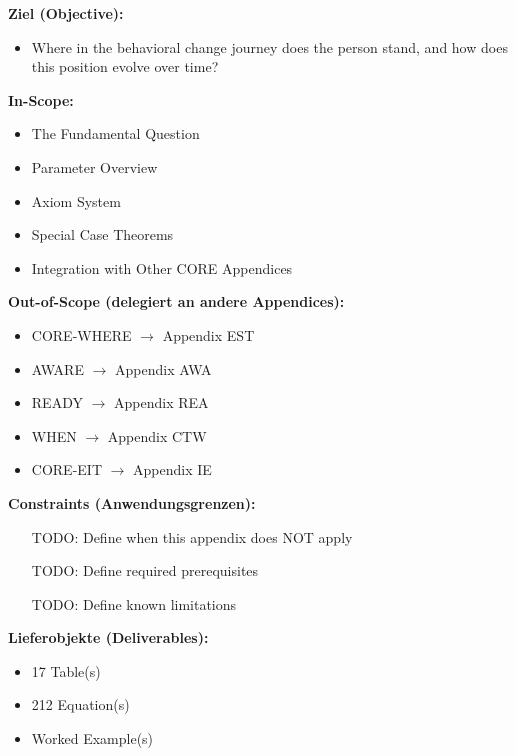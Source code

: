 \begin{tcolorbox}[
    colback=orange!5!white,
    colframe=orange!75!black,
    title={\textbf{Appendix Scope: Ziel / In-Scope / Out-of-Scope / Constraints}},
    fonttitle=\bfseries
]

\textbf{Ziel (Objective):}
\begin{itemize}[nosep]
    \item Where in the behavioral change journey does the person stand, and how does this position evolve over time?
\end{itemize}

\textbf{In-Scope:}
\begin{itemize}[nosep]
    \item The Fundamental Question
    \item Parameter Overview
    \item Axiom System
    \item Special Case Theorems
    \item Integration with Other CORE Appendices
\end{itemize}

\textbf{Out-of-Scope (delegiert an andere Appendices):}
\begin{itemize}[nosep]
    \item CORE-WHERE $\rightarrow$ Appendix EST
    \item AWARE $\rightarrow$ Appendix AWA
    \item READY $\rightarrow$ Appendix REA
    \item WHEN $\rightarrow$ Appendix CTW
    \item CORE-EIT $\rightarrow$ Appendix IE
\end{itemize}

\textbf{Constraints (Anwendungsgrenzen):}
\begin{itemize}[nosep]
    \item [TODO: Define when this appendix does NOT apply]
    \item [TODO: Define required prerequisites]
    \item [TODO: Define known limitations]
\end{itemize}

\textbf{Lieferobjekte (Deliverables):}
\begin{itemize}[nosep]
    \item 17 Table(s)
    \item 212 Equation(s)
    \item Worked Example(s)
\end{itemize}

\end{tcolorbox}



